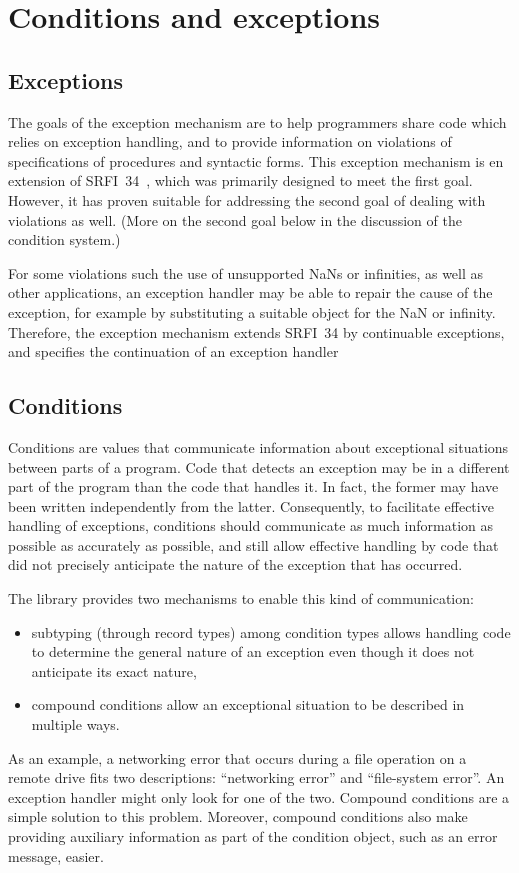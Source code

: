 \documentclass[twoside,twocolumn]{algol60}
\begin{document}
\chapter{Conditions and exceptions}

\section{Exceptions}

The goals of the exception mechanism are to help programmers share
code which relies on exception handling, and to provide information on
violations of specifications of procedures and syntactic forms.  This
exception mechanism is en extension of SRFI~34~\cite{srfi34}, which
was primarily designed to meet the first goal.  However, it has proven
suitable for addressing the second goal of dealing with violations as
well.   (More on the second goal below in the discussion of the
condition system.)

For some violations such the use of unsupported NaNs or infinities, as
well as other applications, an exception handler may be able to
repair the cause of the exception, for example by substituting a
suitable object for the NaN or infinity.  Therefore, the exception
mechanism extends SRFI~34 by continuable exceptions, and specifies the
continuation of an exception handler

\section{Conditions}

Conditions are values that communicate information about exceptional
situations between parts of a program. Code that detects an exception
may be in a different part of the program than the code that handles
it. In fact, the former may have been written independently from the
latter.  Consequently, to facilitate effective handling of exceptions,
conditions should communicate as much information as possible as
accurately as possible, and still allow effective handling by code
that did not precisely anticipate the nature of the exception that has
occurred.

The  library provides two mechanisms to
enable this kind of communication:
%
\begin{itemize}
\item subtyping (through record types) among condition types allows
  handling code to determine the general nature of an exception even
  though it does not anticipate its exact nature,
\item compound conditions allow an exceptional situation to be
  described in multiple ways.
\end{itemize}
%
As an example, a networking error that occurs during a file operation
on a remote drive fits two descriptions: ``networking error'' and
``file-system error''.  An exception handler might only look for one of
the two.  Compound conditions are a simple solution to this problem.
Moreover, compound conditions also make providing auxiliary
information as part of the condition object, such as an error message,
easier.
\end{document}
